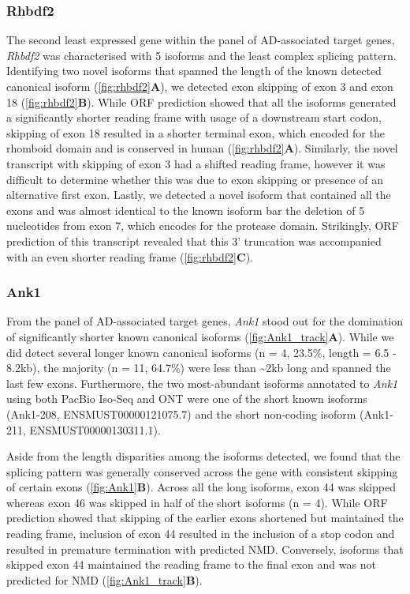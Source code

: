 \subsubsection{Rhbdf2}
The second least expressed gene within the panel of AD-associated target genes, \textit{Rhbdf2} was characterised with 5 isoforms and the least complex splicing pattern. Identifying two novel isoforms that spanned the length of the known detected canonical isoform (\cref{fig:rhbdf2}\textbf{A}), we detected exon skipping of exon 3 and exon 18 (\cref{fig:rhbdf2}\textbf{B}). While ORF prediction showed that all the isoforms generated a significantly shorter reading frame with usage of a downstream start codon, skipping of exon 18 resulted in a shorter terminal exon, which encoded for the rhomboid domain and is conserved in human (\cref{fig:rhbdf2}\textbf{A}). Similarly, the novel transcript with skipping of exon 3 had a shifted reading frame, however it was difficult to determine whether this was due to exon skipping or presence of an alternative first exon. Lastly, we detected a novel isoform that contained all the exons and was almost identical to the known isoform bar the deletion of 5 nucleotides from exon 7, which encodes for the protease domain. Strikingly, ORF prediction of this transcript revealed that this 3' truncation was accompanied with an even shorter reading frame (\cref{fig:rhbdf2}\textbf{C}).   

\subsubsection{Ank1} 
From the panel of AD-associated target genes, \textit{Ank1} stood out for the domination of significantly shorter known canonical isoforms (\cref{fig:Ank1_track}\textbf{A}). While we did detect several longer known canonical isoforms (n = 4, 23.5\%, length = 6.5 - 8.2kb), the majority (n = 11, 64.7\%) were less than \textasciitilde 2kb long and spanned the last few exons. Furthermore, the two most-abundant isoforms annotated to \textit{Ank1} using both PacBio Iso-Seq and ONT were one of the short known isoforms (Ank1-208, ENSMUST00000121075.7) and the short non-coding isoform (Ank1-211, ENSMUST00000130311.1). %

Aside from the length disparities among the isoforms detected, we found that the splicing pattern was generally conserved across the gene with consistent skipping of certain exons (\cref{fig:Ank1}\textbf{B}). Across all the long isoforms, exon 44 was skipped whereas exon 46 was skipped in half of the short isoforms (n = 4). While ORF prediction showed that skipping of the earlier exons shortened but maintained the reading frame, inclusion of exon 44 resulted in the inclusion of a stop codon and resulted in premature termination with predicted NMD. Conversely, isoforms that skipped exon 44 maintained the reading frame to the final exon and was not predicted for NMD  
(\cref{fig:Ank1_track}\textbf{B}).        

